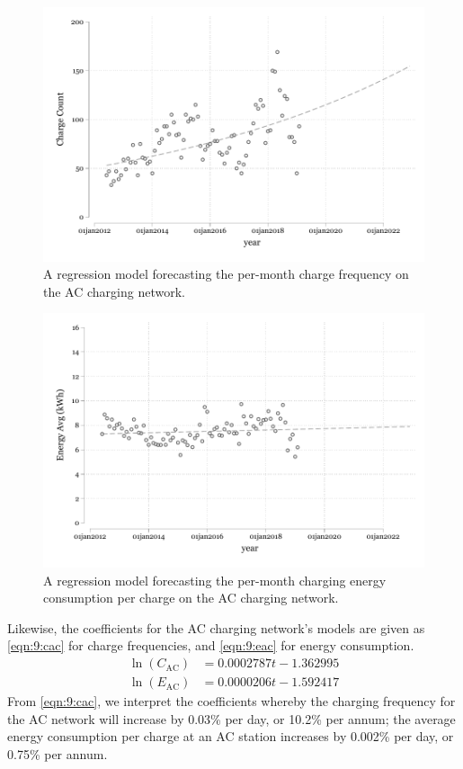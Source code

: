 \begin{figure}[H]
	\centering
	\includegraphics[width=0.9\linewidth]{AC_5_1}
	\caption[AC charge frequency regression model]{A regression model forecasting the per-month charge frequency on the AC charging network.}
	\label{fig:9:accountmodel}
\end{figure}

\begin{figure}[H]
	\centering
	\includegraphics[width=0.9\linewidth]{AC_6_1}
	\caption[AC energy consumption regression model]{A regression model forecasting the per-month charging energy consumption per charge on the AC charging network.}
	\label{fig:9:acenergymodel}
\end{figure}

Likewise, the coefficients for the AC charging network’s models are given as \eqref{eqn:9:cac} for charge frequencies, and \eqref{eqn:9:eac} for energy consumption.
\begin{align}
\ln(C_\mathrm{AC}) &= 0.0002787t - 1.362995
\label{eqn:9:cac} \\
\ln(E_\mathrm{AC}) &= 0.0000206t - 1.592417
\label{eqn:9:eac}
\end{align}
From \eqref{eqn:9:cac}, we interpret the coefficients whereby the charging frequency for the AC network will increase by 0.03\% per day, or 10.2\% per annum; the average energy consumption per charge at an AC station increases by 0.002\% per day, or 0.75\% per annum. 

